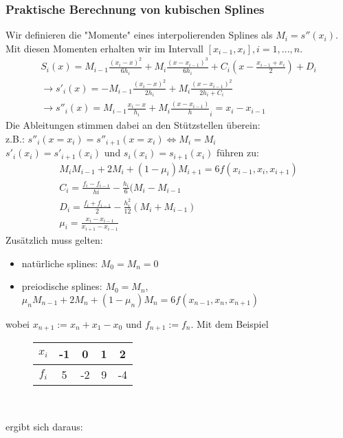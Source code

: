 \documentclass{scrartcl}
\begin{document}
\subsubsection*{Praktische Berechnung von kubischen Splines}
Wir definieren die "Momente" eines interpolierenden Splines als $M_i=s''(x_i)$. Mit diesen Momenten erhalten wir im Intervall $[x_{i-1},x_i], i=1,...,n$.
\begin{align*}
S_i(x)=M_{i-1} \frac{(x_i-x)^2}{6 h_i} + M_i \frac{(x-x_{i-1})^3}{6 h_i}+C_i(x- \frac{x_{i-1}+x_i}{2})+D_i\\
\rightarrow s'_i(x)= -M_{i-1} \frac{(x_i-x)^2}{2 h_i} + M_i \frac{(x-x_{i-1})^2}{2 h_i + C_i} \\
\rightarrow s''_i(x)= M_{i-1} \frac{x_i-x}{h_i} + M_i \frac{(x-x_{i-1})}%
h_i=x_i-x_{i-1}
\end{align*}
Die Ableitungen stimmen dabei an den Stützstellen überein:\\
z.B.: $s''_i(x=x_i)=s''_{i+1}(x=x_i) \Leftrightarrow M_i=M_i$ \\
$s'_i(x_i)=s'_{i+1}(x_i)$ und $s_i(x_i)=s_{i+1}(x_i)$ führen zu:
\begin{align*}
M_i M_{i-1} + 2 M_i + (1- \mu_i) M_{i+1} = 6 f(x_{i-1},x_i,x_{i+1})\\
C_i = \frac{f_i-f_{i-1}}{h i}- \frac{h_i}{6}(M_i-M_{i-1}\\
D_i= \frac{f_i+f_{i-1}}{2} -\frac{h_i^2}{12} (M_i+M_{i-1})\\
\mu_i = \frac{x_i-x_{i-1}}{x_{i+1}-x_{i-1}}
\end{align*}
Zusätzlich muss gelten:
\begin{itemize}
\item natürliche splines: $M_0=M_n=0$
\item preiodische splines: $M_0=M_n$, $\mu_n M_{n-1}+ 2 M_n + (1- \mu_n) M_n=6 f(x_{n-1},x_n,x_{n+1})$
\end{itemize}
wobei $x_{n+1} := x_n+x_1-x_0$ und $f_{n+1} := f_n$.
Mit dem Beispiel \begin{figure}

\center

\begin{tabular}{|c||c|c|c|c|}

$x_i$ & -1 & 0 & 1 & 2 \\ 
\hline 
$f_i$ & 5 & -2 & 9 & -4 \\ 

\end{tabular}\\  
\end{figure} ergibt sich daraus:
\end{document}
